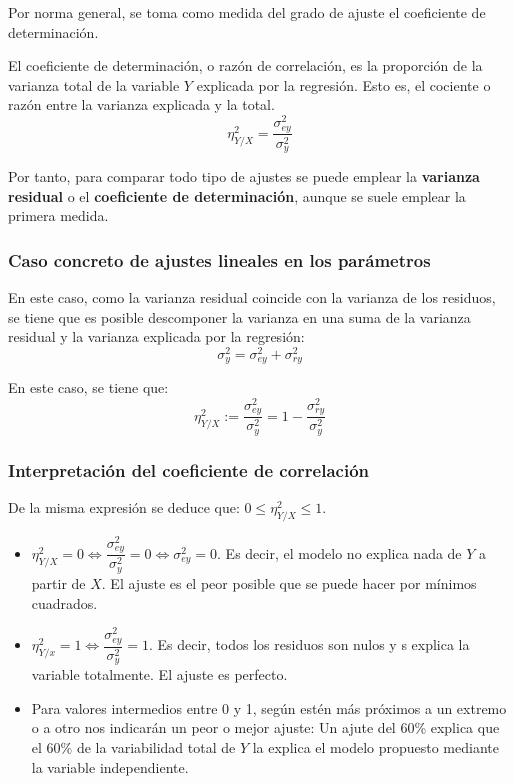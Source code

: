 Por norma general, se toma como medida del grado de ajuste el coeficiente de determinación.
\begin{definicion}
El coeficiente de determinación, o razón de correlación, es la proporción de la varianza total de la variable $Y$ explicada por la regresión. Esto es, el cociente o razón entre la varianza explicada y la total.
\begin{equation*}
    \eta_{Y/X}^2 = \dfrac{\sigma_{ey}^2}{\sigma_y^2}
\end{equation*}    
\end{definicion}


Por tanto, para comparar todo tipo de ajustes se puede emplear la \textbf{varianza residual} o el \textbf{coeficiente de determinación}, aunque se suele emplear la primera medida.

\subsubsection{Caso concreto de ajustes lineales en los parámetros}

En este caso, como la varianza residual coincide con la varianza de los residuos, se tiene que es posible descomponer la varianza en una suma de la varianza residual y la varianza explicada por la regresión:
$$\sigma_y^2 = \sigma_{ey}^2 + \sigma_{ry}^2$$

En este caso, se tiene que:
$$\eta_{Y/X}^2 := \dfrac{\sigma_{ey}^2}{\sigma_y^2} = 1 - \dfrac{\sigma_{ry}^2}{\sigma_y^2}$$


\subsubsection{Interpretación del coeficiente de correlación}

De la misma expresión se deduce que: $0 \leq \eta_{Y/X}^2 \leq 1$.

\begin{itemize}
    \item $\eta_{Y/X}^2 = 0 \Leftrightarrow \dfrac{\sigma_{ey}^2}{\sigma_y^2}=0 \Leftrightarrow \sigma_{ey}^2 = 0$. Es decir, el modelo no explica nada de $Y$ a partir de $X$. El ajuste es el peor posible que se puede hacer por mínimos cuadrados.
    \item $\eta_{Y/x}^2 = 1 \Leftrightarrow \dfrac{\sigma_{ey}^2}{\sigma_y^2}=1$. Es decir, todos los residuos son nulos y s explica la variable totalmente. El ajuste es perfecto.
    \item Para valores intermedios entre 0 y 1, según estén más próximos a un extremo o a otro nos indicarán un peor o mejor ajuste: Un ajute del 60\% explica que el 60\% de la variabilidad total de $Y$ la explica el modelo propuesto mediante la variable independiente.
\end{itemize}

